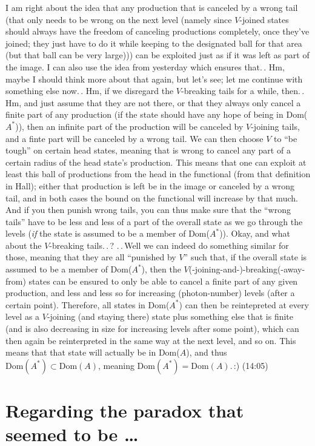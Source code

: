 \documentclass{report}
\begin{document}
I am right about the idea that any production that is canceled by a wrong tail (that only needs to be wrong on the next level (namely since $V$-joined states should always have the freedom of canceling productions completely, once they've joined; they just have to do it while keeping to the designated ball for that area (but that ball can be very large))) can be exploited just as if it was left as part of the image. I can also use the idea from yesterday which ensures that.\,. Hm, maybe I should think more about that again, but let's see; let me continue with something else now.\,. Hm, if we disregard the $V$-breaking tails for a while, then.\,. Hm, and just assume that they are not there, or that they always only cancel a finite part of any production (if the state should have any hope of being in Dom($A^*$)), then an infinite part of the production will be canceled by $V$-joining tails, and a finte part will be canceled by a wrong tail. We can then choose $V$ to ``be tough'' on certain head states, meaning that is wrong to cancel any part of a certain radius of the head state's production. This means that one can exploit at least this ball of productions from the head in the functional (from that definition in Hall); either that production is left be in the image or canceled by a wrong tail, and in both cases the bound on the functional will increase by that much. And if you then punish wrong tails, you can thus make sure that the ``wrong tails'' have to be less and less of a part of the overall state as we go through the levels (\emph{if} the state is assumed to be a member of Dom($A^*$)). Okay, and what about the $V$-breaking tails.\,.\,? .\,.\,Well we can indeed do something similar for those, meaning that they are all ``punished by $V$'' such that, if the overall state is assumed to be a member of Dom($A^*$), then the $V$(-joining-and-)-breaking(-away-from) states can be ensured to only be able to cancel a finite part of any given production, and less and less so for increasing (photon-number) levels (after a certain point). Therefore, all states in Dom($A^*$) can then be reintepreted at every level as a $V$-joining (and staying there) state plus something else that is finite (and is also decreasing in size for increasing levels after some point), which can then again be reinterpreted in the same way at the next level, and so on. This means that that state will actually be in Dom($A$), and thus $\mathrm{Dom}(A^*)\subset\mathrm{Dom}(A)$, meaning $\mathrm{Dom}(A^*)=\mathrm{Dom}(A)$.\,:) (14:05)

\section{Regarding the paradox that seemed to be \ldots}
\end{document}
